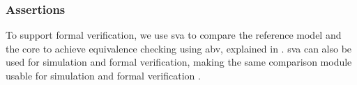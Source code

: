 %
%
%
%
%


\subsubsection{Assertions}

To support formal verification, we use \acrfull{sva} to compare the reference model and the core to achieve equivalence checking using \acrfull{abv}, explained in . \acrshort{sva} can also be used for simulation and formal verification, making the same comparison module usable for simulation and formal verification \cite{cernySVAPowerAssertions2015}. 



